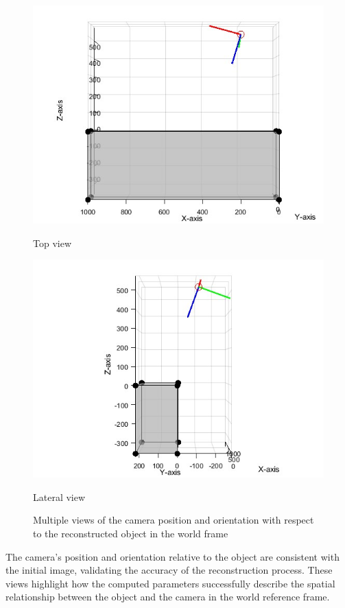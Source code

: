 \documentclass{Academic}
\begin{document}
\begin{figure}[!htb]
    \begin{minipage}{0.4\linewidth}
        \centering
        \includegraphics[width=\linewidth]{images/zx.jpg}
        \caption{Top view}
    \end{minipage}%
    \begin{minipage}{0.4\linewidth}
        \centering
        \includegraphics[width=\linewidth]{images/zy.jpg}
        \caption{Lateral view}
    \end{minipage}
    \caption{Multiple views of the camera position and orientation with respect to the reconstructed object in the world frame}
    \label{fig:3dviews}
\end{figure}

The camera’s position and orientation relative to the object are consistent with the initial image, validating the accuracy of the reconstruction process. 
These views highlight how the computed parameters successfully describe the spatial relationship between the object and the camera in the world reference frame.
\end{document}
